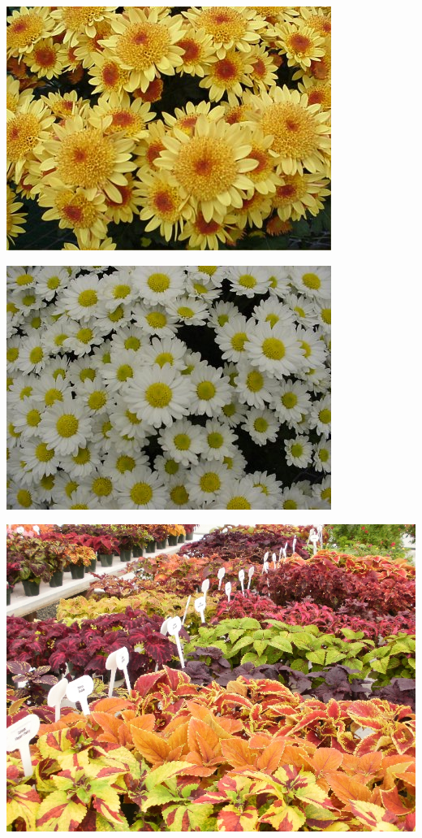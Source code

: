 \documentclass{article}
\begin{document}
\begin{center}
\includegraphics[height=0.9\textheight, angle=90]{../Chrysanthemum_SunFire.jpg}
\end{center}
\newpage

\begin{center}
\includegraphics[height=0.9\textheight, angle=90]{../Chrysanthemum_Sylvie.jpg}
\end{center}
\newpage

\begin{center}
\includegraphics[height=0.9\textheight, angle=90]{../Coleus1.jpg}
\end{center}
\newpage
\end{document}
